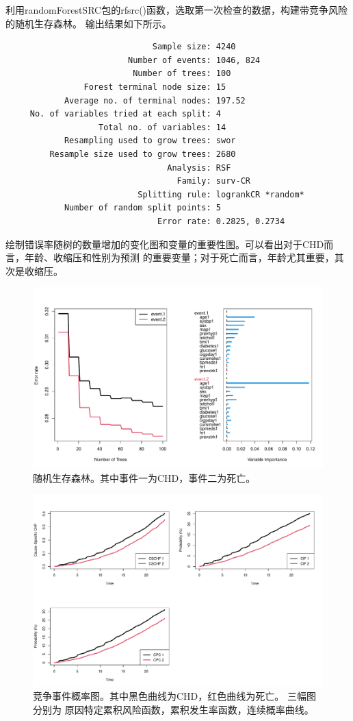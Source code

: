 \documentclass[lang=cn,11pt,a4paper,cite=super,AutoFakeBold]{elegantpaper}
\begin{document}
利用randomForestSRC包的rfsrc()函数，选取第一次检查的数据，构建带竞争风险的随机生存森林。
输出结果如下所示。
\begin{lstlisting}
                              Sample size: 4240
                         Number of events: 1046, 824
                          Number of trees: 100
                Forest terminal node size: 15
            Average no. of terminal nodes: 197.52
     No. of variables tried at each split: 4
                   Total no. of variables: 14
            Resampling used to grow trees: swor
         Resample size used to grow trees: 2680
                                 Analysis: RSF
                                   Family: surv-CR
                           Splitting rule: logrankCR *random*
            Number of random split points: 5
                               Error rate: 0.2825, 0.2734
\end{lstlisting}

绘制错误率随树的数量增加的变化图和变量的重要性图。可以看出对于CHD而言，年龄、收缩压和性别为预测
的重要变量；对于死亡而言，年龄尤其重要，其次是收缩压。
\begin{figure}[htb]
   \centering
   \includegraphics[width=\linewidth]{img/rsfplot.pdf}
   \caption{随机生存森林。其中事件一为CHD，事件二为死亡。}
   \label{fig:rsf}
\end{figure}
\begin{figure}[!hbt]
   \centering
   \includegraphics[width=\linewidth]{img/crt.pdf}
   \caption{竞争事件概率图。其中黑色曲线为CHD，红色曲线为死亡。 三幅图分别为
   原因特定累积风险函数，累积发生率函数，连续概率曲线。   }
   \label{fig:crt}
\end{figure}
\end{document}

